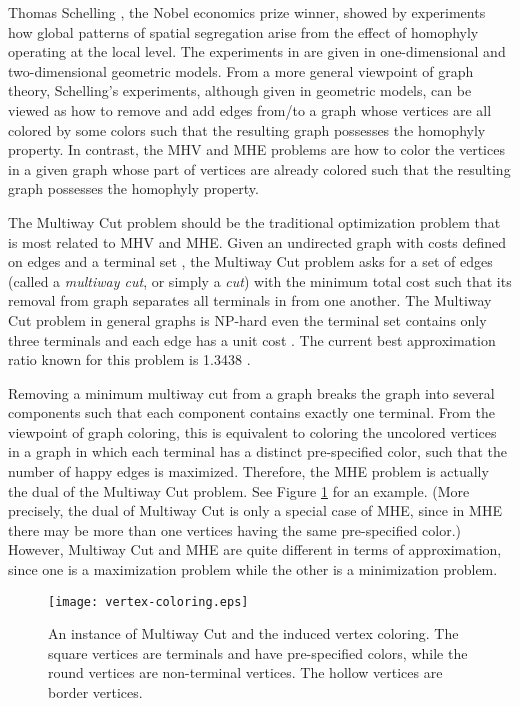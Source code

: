 \documentclass[11pt]{article}
\begin{document}
Thomas Schelling \cite{S72,S78}, the Nobel economics prize winner, showed
by experiments how global patterns of spatial segregation arise from the
effect of homophyly operating at the local level.
The experiments in \cite{S72} are given in one-dimensional and two-dimensional
geometric models.
From a more general viewpoint of graph theory, Schelling's experiments,
although given in geometric models, can be viewed as how to remove and add
edges from/to a graph whose vertices are all colored by some colors
such that the resulting graph possesses the homophyly property.
In contrast, the MHV and MHE problems are how to color the vertices
in a given graph whose part of vertices are already colored such that
the resulting graph possesses the homophyly property.

The Multiway Cut problem \cite{EL92,DJP+94,CKR00,KKS+04} should be
the traditional optimization problem that is most related to MHV and MHE.
Given an undirected graph  with costs defined on edges and
a terminal set , the Multiway Cut problem asks for a set
of edges (called a {\em multiway cut}, or simply a {\em cut}) with the minimum
total cost such that its removal from graph  separates all terminals in 
from one another. The Multiway Cut problem in general graphs is NP-hard even
the terminal set contains only three terminals and each edge has a unit
cost \cite{DJP+94}. The current best approximation ratio known for this
problem is 1.3438 \cite{KKS+04}.

Removing a minimum multiway cut from a graph breaks the graph into several
components such that each component contains exactly one terminal.
From the viewpoint of graph coloring, this is equivalent to coloring the
uncolored vertices in a graph in which each terminal has a distinct
pre-specified color, such that the number of happy edges is maximized.
Therefore, the MHE problem is actually the dual of the Multiway Cut problem.
See Figure \ref{fig - multiway cut and vertex coloring} for an example.
(More precisely, the dual of Multiway Cut is only a special case of MHE,
since in MHE there may be more than one vertices having the same pre-specified
color.) However, Multiway Cut and MHE are quite different in terms of
approximation, since one is a maximization problem while the other is
a minimization problem.

\begin{figure}
\begin{center}
\texttt{[image: vertex-coloring.eps]}
\end{center}
\caption{An instance of Multiway Cut and the induced vertex coloring.
The square vertices are terminals and have pre-specified colors,
while the round vertices are non-terminal vertices.
The hollow vertices are border vertices.}
\label{fig - multiway cut and vertex coloring}
\end{figure}
\end{document}
